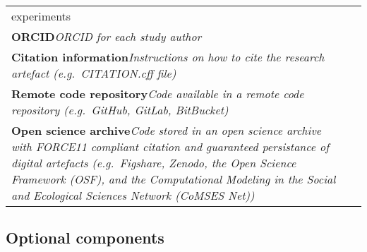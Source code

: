 \begin{longtable}[]{@{}ll@{}}
\begin{minipage}[t]{0.47\columnwidth}
{experiments}\strut
\end{minipage} & \begin{minipage}[t]{0.47\columnwidth}\raggedright
\strut
\end{minipage}\tabularnewline
\begin{minipage}[t]{0.47\columnwidth}\raggedright
\textbf{ORCID}\emph{ORCID for each study author}\strut
\end{minipage} & \begin{minipage}[t]{0.47\columnwidth}\raggedright
\strut
\end{minipage}\tabularnewline
\begin{minipage}[t]{0.47\columnwidth}\raggedright
\textbf{Citation information}\emph{Instructions on how to cite the
research artefact (e.g.~CITATION.cff file)}\strut
\end{minipage} & \begin{minipage}[t]{0.47\columnwidth}\raggedright
\strut
\end{minipage}\tabularnewline
\begin{minipage}[t]{0.47\columnwidth}\raggedright
\textbf{Remote code repository}\emph{Code available in a remote code
repository (e.g.~GitHub, GitLab, BitBucket)}\strut
\end{minipage} & \begin{minipage}[t]{0.47\columnwidth}\raggedright
\strut
\end{minipage}\tabularnewline
\begin{minipage}[t]{0.47\columnwidth}\raggedright
\textbf{Open science archive}\emph{Code stored in an open science
archive with FORCE11 compliant citation and guaranteed persistance of
digital artefacts (e.g.~Figshare, Zenodo, the Open Science Framework
(OSF), and the Computational Modeling in the Social and Ecological
Sciences Network (CoMSES Net))}\strut
\end{minipage} & \begin{minipage}[t]{0.47\columnwidth}\raggedright
\strut
\end{minipage}\tabularnewline
\bottomrule
\end{longtable}

\hypertarget{optional-components}{%
\subsection{Optional components}\label{optional-components}}

